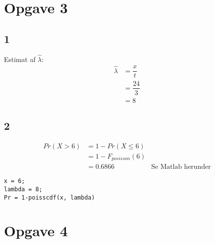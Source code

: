\documentclass{article}
\begin{document}

\section*{Opgave 3} %
\label{sec:opgave_3}

\subsection*{1} %
Estimat af $\hat{\lambda}$:
\begin{align}
\hat{\lambda} &= \dfrac{x}{t} \\
	&= \dfrac{24}{3} \\
	&= 8
\end{align}


\subsection*{2} %
\begin{align}
Pr\left(X > 6 \right) &= 1 - Pr(X \leq 6) \\
	&= 1- F_{posisson}(6)\\
	&= 0.6866 & \text{Se Matlab herunder}
\end{align}

\begin{lstlisting}[caption=Kode for Opg 3.2, style=Code-Matlab, label=lst:opg32]
x = 6;
lambda = 8;
Pr = 1-poisscdf(x, lambda)
\end{lstlisting}



\newpage
\section*{Opgave 4} %
\label{sec:opgave_4}



\end{document}
